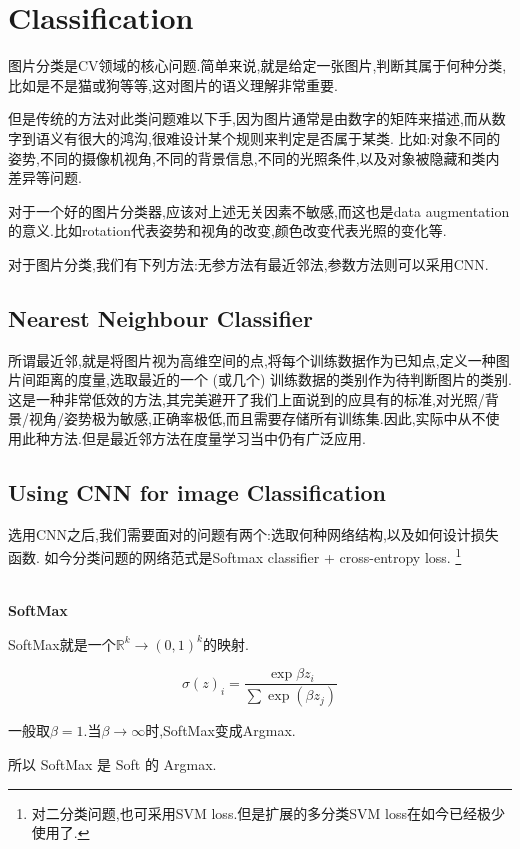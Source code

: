 \chapter{Classification}

图片分类是CV领域的核心问题.简单来说,就是给定一张图片,判断其属于何种分类,比如是不是猫或狗等等,这对图片的语义理解非常重要.

但是传统的方法对此类问题难以下手,因为图片通常是由数字的矩阵来描述,而从数字到语义有很大的鸿沟,很难设计某个规则来判定是否属于某类.
比如:对象不同的姿势,不同的摄像机视角,不同的背景信息,不同的光照条件,以及对象被隐藏和类内差异等问题.

对于一个好的图片分类器,应该对上述无关因素不敏感,而这也是data augmentation的意义.比如rotation代表姿势和视角的改变,颜色改变代表光照的变化等.

对于图片分类,我们有下列方法:无参方法有最近邻法,参数方法则可以采用CNN.

\section{Nearest Neighbour Classifier}

所谓最近邻,就是将图片视为高维空间的点,将每个训练数据作为已知点,定义一种图片间距离的度量,选取最近的一个 (或几个)
训练数据的类别作为待判断图片的类别.这是一种非常低效的方法,其完美避开了我们上面说到的应具有的标准,对光照/背景/视角/姿势极为敏感,正确率极低,而且需要存储所有训练集.因此,实际中从不使用此种方法.但是最近邻方法在度量学习当中仍有广泛应用.

\section{Using CNN for image Classification}

选用CNN之后,我们需要面对的问题有两个:选取何种网络结构,以及如何设计损失函数.
如今分类问题的网络范式是Softmax classifier + cross-entropy loss.
\footnote{对二分类问题,也可采用SVM loss.但是扩展的多分类SVM loss在如今已经极少使用了.}

\textbf{\\SoftMax}

SoftMax就是一个${\mathbb R}^k \to {(0, 1)}^k$的映射.

\begin{equation}
	\sigma(z)_i = \frac{\exp{\beta z_i}}{\sum \exp(\beta z_j)}
\end{equation}

一般取$\beta = 1.$当$\beta \to \infty$时,SoftMax变成Argmax.

所以 SoftMax 是 Soft 的 Argmax.

